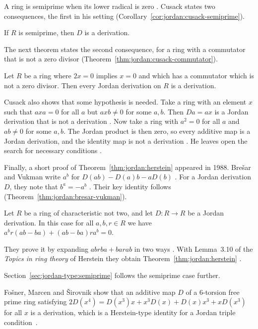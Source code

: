 A ring is semiprime when its lower radical is zero \cite[p.~322]{Cusack1975}. Cusack
states two consequences, the first in his setting (Corollary~\ref{cor:jordan:cusack-semiprime}).

\begin{corollary}\label{cor:jordan:cusack-semiprime}
If $R$ is semiprime, then $D$ is a derivation.
\end{corollary}

The next theorem states the second consequence, for a ring with a commutator that is not a zero divisor (Theorem~\ref{thm:jordan:cusack-commutator}).

\begin{theorem}\label{thm:jordan:cusack-commutator}
Let $R$ be a ring where $2x=0$ implies $x=0$ and which has a commutator which is not a
zero divisor. Then every Jordan derivation on $R$ is a derivation.
\end{theorem}

Cusack also shows that some hypothesis is needed. Take a ring with an element $x$ such
that $axa=0$ for all $a$ but $axb\neq0$ for some $a,b$. Then $Da=ax$ is a Jordan
derivation that is not a derivation \cite[\S3, p.~324]{Cusack1975}. Now take a ring with
$a^{2}=0$ for all $a$ and $ab\neq0$ for some $a,b$. The Jordan product is then zero, so
every additive map is a Jordan derivation, and the identity map is not a derivation
\cite[\S3, p.~324]{Cusack1975}. He leaves open the search for necessary conditions
\cite[p.~324]{Cusack1975}.

Finally, a short proof of Theorem~\ref{thm:jordan:herstein} appeared in 1988. Brešar and
Vukman write $a^{b}$ for $D(ab)-D(a)b-aD(b)$ \cite[p.~321]{BresarVukman1988}. For a
Jordan derivation $D$, they note that $b^{a}=-a^{b}$ \cite[p.~321]{BresarVukman1988}.
Their key identity follows (Theorem~\ref{thm:jordan:bresar-vukman}).

\begin{theorem}\label{thm:jordan:bresar-vukman}
Let $R$ be a ring of characteristic not two, and let $D\colon R\to R$ be a Jordan
derivation. In this case for all $a,b,r\in R$ we have
$a^{b}r(ab-ba)+(ab-ba)ra^{b}=0$.
\end{theorem}

They prove it by expanding $abrba+barab$ in two ways \cite[p.~322]{BresarVukman1988}.
With Lemma~3.10 of the \emph{Topics in ring theory} of Herstein they obtain
Theorem~\ref{thm:jordan:herstein} \cite[p.~322]{BresarVukman1988}.

Section~\ref{sec:jordan-type:semiprime} follows the semiprime case further.

Fo\v{s}ner, Marcen and \v{S}irovnik show that an additive map $D$ of a 6-torsion free prime ring satisfying $2D(x^4)=D(x^3)x+x^3D(x)+D(x)x^3+xD(x^3)$ for all $x$ is a derivation, which is a Herstein-type identity for a Jordan triple condition~\cite{WlOnCertainIdentityRelatedToHers2016}.
